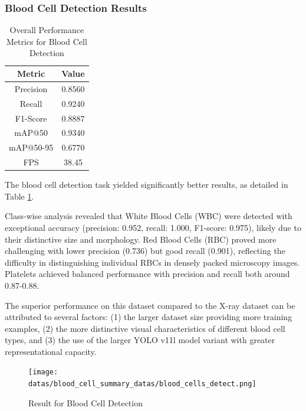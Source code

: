 \vspace{0.5in}


\subsubsection{Blood Cell Detection Results}

\begin{table}[ht]
\centering
\begin{tabular}{|c|c|}
\hline
\textbf{Metric} & \textbf{Value} \\
\hline
Precision & 0.8560 \\
Recall & 0.9240 \\
F1-Score & 0.8887 \\
mAP@50 & 0.9340 \\
mAP@50-95 & 0.6770 \\
FPS & 38.45 \\
\hline
\end{tabular}
\caption{Overall Performance Metrics for Blood Cell Detection}
\label{tab:blood_cell_results}
\end{table}

\begin{multicols}{2}
The blood cell detection task yielded significantly better results, as detailed in Table \ref{tab:blood_cell_results}.

Class-wise analysis revealed that White Blood Cells (WBC) were detected with exceptional accuracy (precision: 0.952, recall: 1.000, F1-score: 0.975), likely due to their distinctive size and morphology. Red Blood Cells (RBC) proved more challenging with lower precision (0.736) but good recall (0.901), reflecting the difficulty in distinguishing individual RBCs in densely packed microscopy images. Platelets achieved balanced performance with precision and recall both around 0.87-0.88.
\end{multicols}

\begin{multicols}{2}
The superior performance on this dataset compared to the X-ray dataset can be attributed to several factors: (1) the larger dataset size providing more training examples, (2) the more distinctive visual characteristics of different blood cell types, and (3) the use of the larger YOLO v11l model variant with greater representational capacity.
\end{multicols}

\begin{figure}[ht]
\centering
\texttt{[image: datas/blood\_cell\_summary\_datas/blood\_cells\_detect.png]}
\caption{Result for Blood Cell Detection}
\label{fig:blood_cell_class_metrics}
\end{figure}

